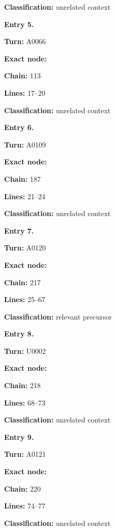 \documentclass[10pt,a4paper,oneside]{report}
\begin{document}
\textbf{Classification:} unrelated context


\textbf{Entry 5.}

\textbf{Turn:} A0066

\textbf{Exact node:} \protect{}

\textbf{Chain:} 113

\textbf{Lines:} 17--20

\textbf{Classification:} unrelated context


\textbf{Entry 6.}

\textbf{Turn:} A0109

\textbf{Exact node:} \protect{}

\textbf{Chain:} 187

\textbf{Lines:} 21--24

\textbf{Classification:} unrelated context


\textbf{Entry 7.}

\textbf{Turn:} A0120

\textbf{Exact node:} \protect{}

\textbf{Chain:} 217

\textbf{Lines:} 25--67

\textbf{Classification:} relevant precursor


\textbf{Entry 8.}

\textbf{Turn:} U0002

\textbf{Exact node:} \protect{}

\textbf{Chain:} 218

\textbf{Lines:} 68--73

\textbf{Classification:} unrelated context


\textbf{Entry 9.}

\textbf{Turn:} A0121

\textbf{Exact node:} \protect{}

\textbf{Chain:} 220

\textbf{Lines:} 74--77

\textbf{Classification:} unrelated context
\end{document}

